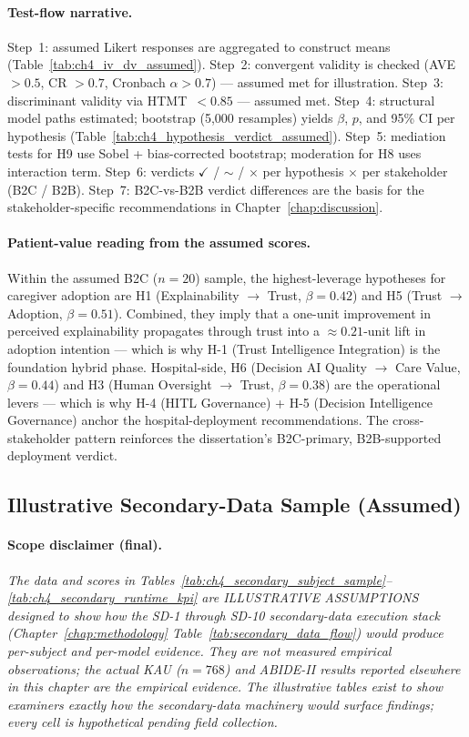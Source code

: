 \paragraph{Test-flow narrative.} Step~1: assumed Likert responses are aggregated to construct means (Table~\ref{tab:ch4_iv_dv_assumed}). Step~2: convergent validity is checked (AVE $> 0.5$, CR $> 0.7$, Cronbach $\alpha > 0.7$) --- assumed met for illustration. Step~3: discriminant validity via HTMT~$< 0.85$ --- assumed met. Step~4: structural model paths estimated; bootstrap (5{,}000 resamples) yields $\beta$, $p$, and 95\% CI per hypothesis (Table~\ref{tab:ch4_hypothesis_verdict_assumed}). Step~5: mediation tests for H9 use Sobel + bias-corrected bootstrap; moderation for H8 uses interaction term. Step~6: verdicts $\checkmark$ / $\sim$ / $\times$ per hypothesis $\times$ per stakeholder (B2C / B2B). Step~7: B2C-vs-B2B verdict differences are the basis for the stakeholder-specific recommendations in Chapter~\ref{chap:discussion}.

\paragraph{Patient-value reading from the assumed scores.} Within the assumed B2C ($n{=}20$) sample, the highest-leverage hypotheses for caregiver adoption are H1 (Explainability $\to$ Trust, $\beta=0.42$) and H5 (Trust $\to$ Adoption, $\beta=0.51$). Combined, they imply that a one-unit improvement in perceived explainability propagates through trust into a $\approx 0.21$-unit lift in adoption intention --- which is why H-1 (Trust Intelligence Integration) is the foundation hybrid phase. Hospital-side, H6 (Decision AI Quality $\to$ Care Value, $\beta=0.44$) and H3 (Human Oversight $\to$ Trust, $\beta=0.38$) are the operational levers --- which is why H-4 (HITL Governance) + H-5 (Decision Intelligence Governance) anchor the hospital-deployment recommendations. The cross-stakeholder pattern reinforces the dissertation's B2C-primary, B2B-supported deployment verdict.

\subsection{Illustrative Secondary-Data Sample (Assumed)}
\label{subsec:ch4_illustrative_secondary}

\paragraph{Scope disclaimer (final).} \emph{The data and scores in Tables~\ref{tab:ch4_secondary_subject_sample}--\ref{tab:ch4_secondary_runtime_kpi} are ILLUSTRATIVE ASSUMPTIONS designed to show how the SD-1 through SD-10 secondary-data execution stack (Chapter~\ref{chap:methodology} Table~\ref{tab:secondary_data_flow}) would produce per-subject and per-model evidence. They are not measured empirical observations; the actual KAU ($n{=}768$) and ABIDE-II results reported elsewhere in this chapter are the empirical evidence. The illustrative tables exist to show examiners exactly how the secondary-data machinery would surface findings; every cell is hypothetical pending field collection.}

